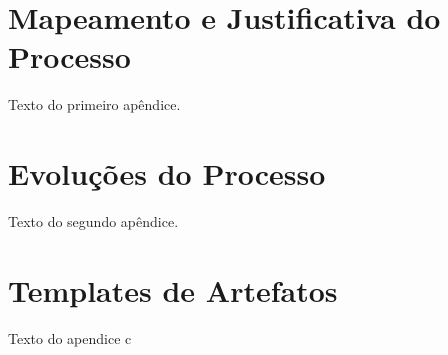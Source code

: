 \begin{apendicesenv}

\partapendices

\chapter{Mapeamento e Justificativa do Processo }\label{apendice:mapeamento}

Texto do primeiro apêndice.

\chapter{Evoluções do Processo}\label{apendice:evolution}

Texto do segundo apêndice.

\chapter{Templates de Artefatos}\label{apendice:templates}

Texto do apendice c

\end{apendicesenv}
